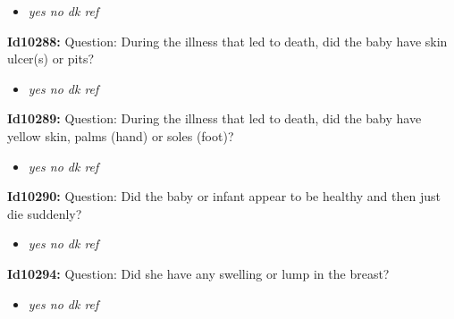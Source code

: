 \documentclass{article}%
\begin{document}
%
\begin{itemize}%
\item%
\textit{yes\newline%
 no\newline%
 dk\newline%
 ref\newline%
}%
\end{itemize}%
\textbf{Id10288: \newline%
}%
Question: During the illness that led to death, did the baby have skin ulcer(s) or pits?\newline%
%
\begin{itemize}%
\item%
\textit{yes\newline%
 no\newline%
 dk\newline%
 ref\newline%
}%
\end{itemize}%
\textbf{Id10289: \newline%
}%
Question: During the illness that led to death, did the baby have yellow skin, palms (hand) or soles (foot)?\newline%
%
\begin{itemize}%
\item%
\textit{yes\newline%
 no\newline%
 dk\newline%
 ref\newline%
}%
\end{itemize}%
\textbf{Id10290: \newline%
}%
Question: Did the baby or infant appear to be healthy and then just die suddenly?\newline%
%
\begin{itemize}%
\item%
\textit{yes\newline%
 no\newline%
 dk\newline%
 ref\newline%
}%
\end{itemize}%
\textbf{Id10294: \newline%
}%
Question: Did she have any swelling or lump in the breast?\newline%
%
\begin{itemize}%
\item%
\textit{yes\newline%
 no\newline%
 dk\newline%
 ref\newline%
}%
\end{itemize}%
\end{document}

